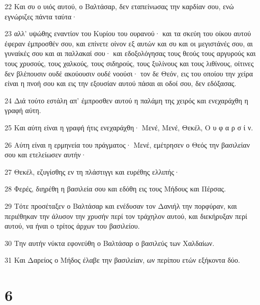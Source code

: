 \par 22 Και συ ο υιός αυτού, ο Βαλτάσαρ, δεν εταπείνωσας την καρδίαν σου, ενώ εγνώριζες πάντα ταύτα·
\par 23 αλλ' υψώθης εναντίον του Κυρίου του ουρανού· και τα σκεύη του οίκου αυτού έφεραν έμπροσθέν σου, και επίνετε οίνον εξ αυτών και συ και οι μεγιστάνές σου, αι γυναίκές σου και αι παλλακαί σου· και εδοξολόγησας τους θεούς τους αργυρούς και τους χρυσούς, τους χαλκούς, τους σιδηρούς, τους ξυλίνους και τους λιθίνους, οίτινες δεν βλέπουσιν ουδέ ακούουσιν ουδέ νοούσι· τον δε Θεόν, εις του οποίου την χείρα είναι η πνοή σου και εις την εξουσίαν αυτού πάσαι αι οδοί σου, δεν εδόξασας.
\par 24 Διά τούτο εστάλη απ' έμπροσθεν αυτού η παλάμη της χειρός και ενεχαράχθη η γραφή αύτη.
\par 25 Και αύτη είναι η γραφή ήτις ενεχαράχθη· Μενέ, Μενέ, Θεκέλ, Ο υ φ α ρ σ ί ν.
\par 26 Αύτη είναι η ερμηνεία του πράγματος· Μενέ, εμέτρησεν ο Θεός την βασιλείαν σου και ετελείωσεν αυτήν·
\par 27 Θεκέλ, εζυγίσθης εν τη πλάστιγγι και ευρέθης ελλιπής·
\par 28 Φερές, διηρέθη η βασιλεία σου και εδόθη εις τους Μήδους και Πέρσας.
\par 29 Τότε προσέταξεν ο Βαλτάσαρ και ενέδυσαν τον Δανιήλ την πορφύραν, και περιέθηκαν την άλυσον την χρυσήν περί τον τράχηλον αυτού, και διεκήρυξαν περί αυτού, να ήναι ο τρίτος άρχων του βασιλείου.
\par 30 Την αυτήν νύκτα εφονεύθη ο Βαλτάσαρ ο βασιλεύς των Χαλδαίων.
\par 31 Και Δαρείος ο Μήδος έλαβε την βασιλείαν, ων περίπου ετών εξήκοντα δύο.

\chapter{6}

